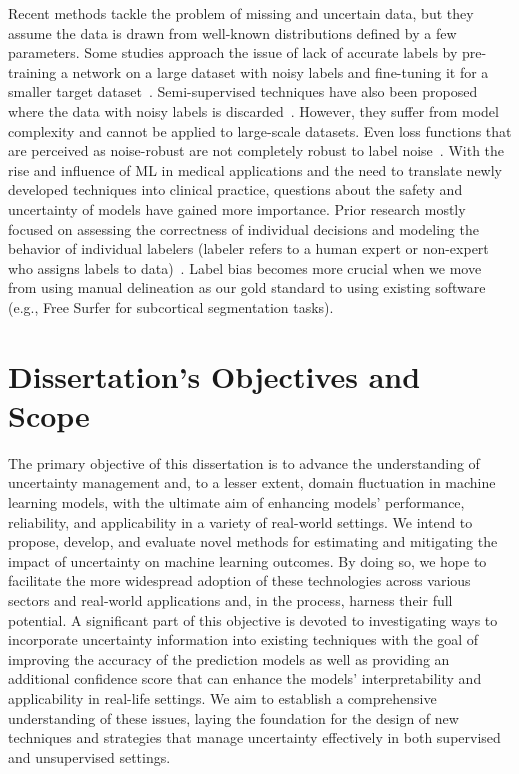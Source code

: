 Recent methods tackle the problem of missing and uncertain data, but they assume the data is drawn from well-known distributions defined by a few parameters. Some studies approach the issue of lack of accurate labels by pre-training a network on a large dataset with noisy labels and fine-tuning it for a smaller target dataset~\cite{oquab_Learning_2014}. Semi-supervised techniques have also been proposed where the data with noisy labels is discarded~\cite{zhu_Learning_2002}. However, they suffer from model complexity and cannot be applied to large-scale datasets. Even loss functions that are perceived as noise-robust are not completely robust to label noise~\cite{bartlett_Convexity_2006}. With the rise and influence of ML in medical applications and the need to translate newly developed techniques into clinical practice, questions about the safety and uncertainty of models have gained more importance. Prior research mostly focused on assessing the correctness of individual decisions and modeling the behavior of individual labelers (labeler refers to a human expert or non-expert who assigns labels to data)~\cite{raykar_Supervised_2009}. Label bias becomes more crucial when we move from using manual delineation as our gold standard to using existing software (e.g., Free Surfer for subcortical segmentation tasks).

\section{Dissertation's Objectives and Scope}
The primary objective of this dissertation is to advance the understanding of uncertainty management and, to a lesser extent, domain fluctuation in machine learning models, with the ultimate aim of enhancing models' performance, reliability, and applicability in a variety of real-world settings. We intend to propose, develop, and evaluate novel methods for estimating and mitigating the impact of uncertainty on machine learning outcomes. By doing so, we hope to facilitate the more widespread adoption of these technologies across various sectors and real-world applications and, in the process, harness their full potential.
A significant part of this objective is devoted to investigating ways to incorporate uncertainty information into existing techniques with the goal of improving the accuracy of the prediction models as well as providing an additional confidence score that can enhance the models' interpretability and applicability in real-life settings. We aim to establish a comprehensive understanding of these issues, laying the foundation for the design of new techniques and strategies that manage uncertainty effectively in both supervised and unsupervised settings.

